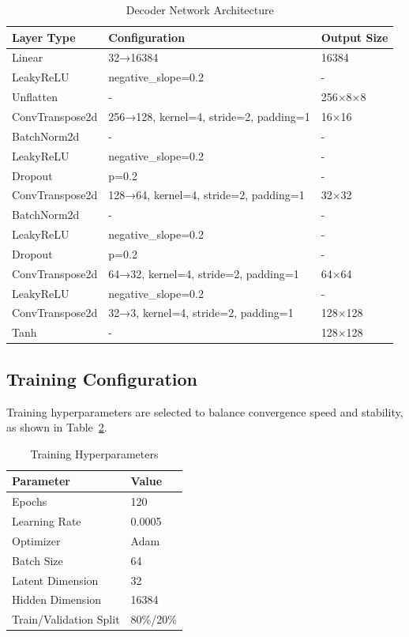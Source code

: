 \documentclass[conference]{IEEEtran}
\begin{document}
\begin{table}[t]
\centering
\caption{Decoder Network Architecture}
\label{tab:decoder}
\begin{tabular}{@{}lll@{}}
\toprule
\textbf{Layer Type} & \textbf{Configuration} & \textbf{Output Size} \\
\midrule
Linear & 32→16384 & 16384 \\
LeakyReLU & negative\_slope=0.2 & - \\
Unflatten & - & 256×8×8 \\
ConvTranspose2d & 256→128, kernel=4, stride=2, padding=1 & 16×16 \\
BatchNorm2d & - & - \\
LeakyReLU & negative\_slope=0.2 & - \\
Dropout & p=0.2 & - \\
ConvTranspose2d & 128→64, kernel=4, stride=2, padding=1 & 32×32 \\
BatchNorm2d & - & - \\
LeakyReLU & negative\_slope=0.2 & - \\
Dropout & p=0.2 & - \\
ConvTranspose2d & 64→32, kernel=4, stride=2, padding=1 & 64×64 \\
LeakyReLU & negative\_slope=0.2 & - \\
ConvTranspose2d & 32→3, kernel=4, stride=2, padding=1 & 128×128 \\
Tanh & - & 128×128 \\
\bottomrule
\end{tabular}
\end{table}

\subsection{Training Configuration}

Training hyperparameters are selected to balance convergence speed and stability, as shown in Table~\ref{tab:hyperparams}.

\begin{table}[t]
\centering
\caption{Training Hyperparameters}
\label{tab:hyperparams}
\begin{tabular}{@{}ll@{}}
\toprule
\textbf{Parameter} & \textbf{Value} \\
\midrule
Epochs & 120 \\
Learning Rate & 0.0005 \\
Optimizer & Adam \\
Batch Size & 64 \\
Latent Dimension & 32 \\
Hidden Dimension & 16384 \\
Train/Validation Split & 80\%/20\% \\
\bottomrule
\end{tabular}
\end{table}
\end{document}
